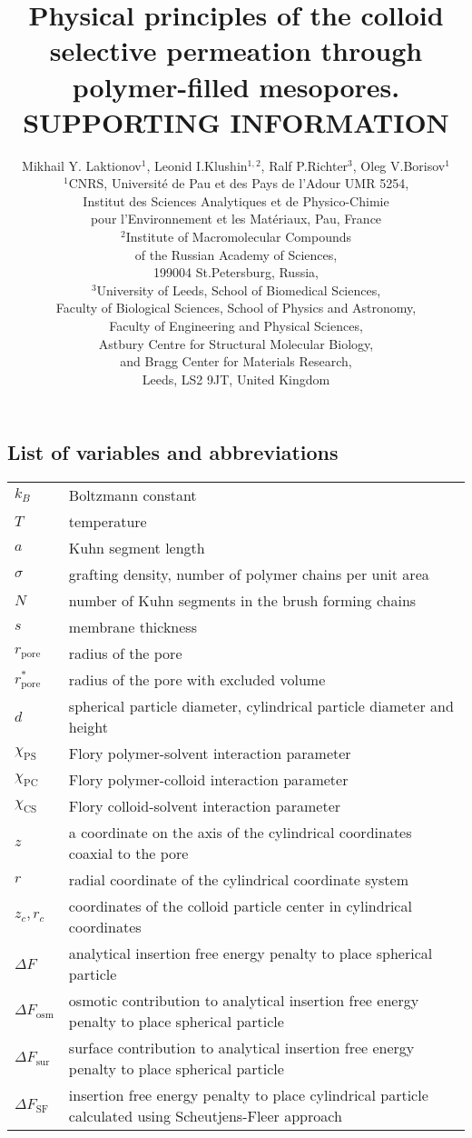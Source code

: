 \documentclass[10pt, a4paper]{article}
\title{Physical principles of the colloid selective permeation through polymer-filled mesopores.\\
        SUPPORTING INFORMATION}
\author{Mikhail Y. Laktionov$^1$, Leonid I.Klushin$^{1,2}$, Ralf P.Richter$^3$, Oleg V.Borisov$^1$\\
$^{1}$CNRS, Universit\'e de Pau et des Pays de l'Adour UMR 5254,\\
Institut des Sciences Analytiques et de Physico-Chimie\\
pour l'Environnement et les Mat\'eriaux, Pau, France \\
$^{2}$Institute of Macromolecular Compounds \\
of the Russian Academy of Sciences, \\
199004 St.Petersburg, Russia,\\
$^{3}$University of Leeds, School of Biomedical Sciences, \\
Faculty of Biological Sciences, 
School of Physics and Astronomy, \\
Faculty of Engineering and Physical Sciences,\\  
Astbury Centre for Structural Molecular Biology,\\ 
and Bragg Center for Materials Research,\\ 
Leeds, LS2 9JT, United Kingdom}
\begin{document}
\maketitle

\subsection*{List of variables and abbreviations}

\begin{tabularx}{\linewidth}{l l}
$k_B$ & Boltzmann constant \\
$T$ & temperature \\
$a$ & Kuhn segment length \\
$\sigma$ & grafting density, number of polymer chains per unit area \\
$N$ & number of Kuhn segments in the brush forming chains \\
$s$ & membrane thickness \\
$r_{\textrm{pore}}$ & radius of the pore \\
$r^{\ast}_{\textrm{pore}}$ & radius of the pore with excluded volume \\
$d$ & spherical particle diameter, cylindrical particle diameter and height \\ 
$\chi_{\textrm{PS}}$ & Flory polymer-solvent interaction parameter  \\
$\chi_{\textrm{PC}}$ & Flory polymer-colloid interaction parameter  \\
$\chi_{\textrm{CS}}$ & Flory colloid-solvent interaction parameter  \\
$z$ & a coordinate on the axis of the cylindrical coordinates coaxial to the pore \\
$r$ & radial coordinate of the cylindrical coordinate system \\
$z_{c}, r_{c}$ & coordinates of the colloid particle center in cylindrical coordinates \\
$\Delta F$ & analytical insertion free energy penalty to place spherical particle \\
$\Delta F_{\textrm{osm}}$ & osmotic contribution to analytical insertion free energy penalty to place spherical particle \\
$\Delta F_{\textrm{sur}}$ & surface contribution to analytical insertion free energy penalty to place spherical particle \\
$\Delta F_{\textrm{SF}}$ & insertion free energy penalty to place cylindrical particle calculated using Scheutjens-Fleer approach \\

\end{tabularx}
\end{document}
